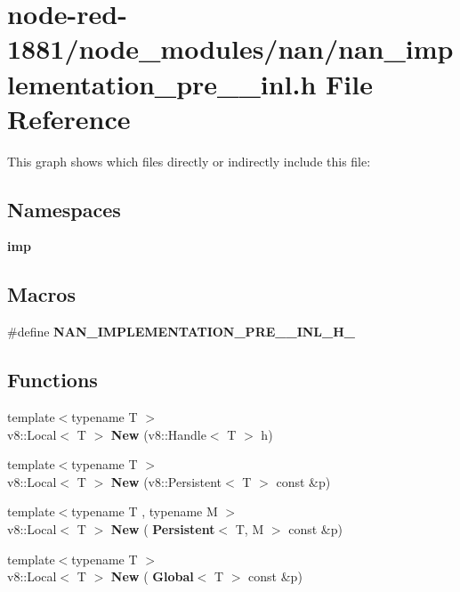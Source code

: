 \section{node-\/red-\/1881/node\+\_\+modules/nan/nan\+\_\+implementation\+\_\+pre\+\_\+\_\+inl.h File Reference}
\label{nan__implementation__pre__12__inl_8h}
This graph shows which files directly or indirectly include this file\+:
\subsection*{Namespaces}
\begin{DoxyCompactItemize}
\item 
 \textbf{ imp}
\end{DoxyCompactItemize}
\subsection*{Macros}
\begin{DoxyCompactItemize}
\item 
\#define \textbf{ N\+A\+N\+\_\+\+I\+M\+P\+L\+E\+M\+E\+N\+T\+A\+T\+I\+O\+N\+\_\+\+P\+R\+E\+\_\+\_\+\+I\+N\+L\+\_\+\+H\+\_\+}
\end{DoxyCompactItemize}
\subsection*{Functions}
\begin{DoxyCompactItemize}
\item 
{\footnotesize template$<$typename T $>$ }\\v8\+::\+Local$<$ T $>$ \textbf{ New} (v8\+::\+Handle$<$ T $>$ h)
\item 
{\footnotesize template$<$typename T $>$ }\\v8\+::\+Local$<$ T $>$ \textbf{ New} (v8\+::\+Persistent$<$ T $>$ const \&p)
\item 
{\footnotesize template$<$typename T , typename M $>$ }\\v8\+::\+Local$<$ T $>$ \textbf{ New} (\textbf{ Persistent}$<$ T, M $>$ const \&p)
\item 
{\footnotesize template$<$typename T $>$ }\\v8\+::\+Local$<$ T $>$ \textbf{ New} (\textbf{ Global}$<$ T $>$ const \&p)
\end{DoxyCompactItemize}


